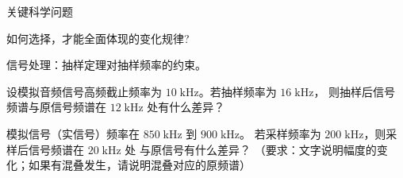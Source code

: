 
关键科学问题

如何选择，才能全面体现的变化规律?

信号处理：抽样定理对抽样频率的约束。

\begin{figure}[H]
\end{figure}

\begin{example}
    设模拟音频信号高频截止频率为 $10\;\mathrm{kHz}$。若抽样频率为 $16\;\mathrm{kHz}$，
    则抽样后信号频谱与原信号频谱在 $12\;\mathrm{kHz}$ 处有什么差异？
\end{example}

\begin{example}
    模拟信号（实信号）频率在 $850\;\mathrm{kHz}$ 到 $900\;\mathrm{kHz}$。
    若采样频率为 $200\;\mathrm{kHz}$，则采样后信号频谱在 $20\;\mathrm{kHz}$ 处
    与原信号有什么差异？
    （要求：文字说明幅度的变化；如果有混叠发生，请说明混叠对应的原频谱）
\end{example}

